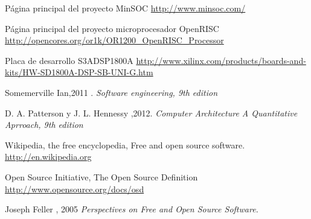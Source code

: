 \documentclass[a4paper,12pt]{article}
\begin{document}
\begin{thebibliography}{99}	  
  Página principal del proyecto MinSOC
\url{http://www.minsoc.com/}

 Página principal del proyecto microprocesador OpenRISC
\url{http://opencores.org/or1k/OR1200_OpenRISC_Processor}

 Placa de desarrollo S3ADSP1800A
\url{http://www.xilinx.com/products/boards-and-kits/HW-SD1800A-DSP-SB-UNI-G.htm}

 Somemerville Ian,2011 .
\textit{Software engineering, 9th edition}

 D. A. Patterson y J. L. Hennessy ,2012.
 \textit{Computer Architecture A Quantitative Aprroach, 9th edition}

Wikipedia, the free encyclopedia, Free and open source software.
\url{http://en.wikipedia.org}

Open Source Initiative, The Open Source Definition
\url{http://www.opensource.org/docs/osd}

Joseph Feller , 2005 
\textit{Perspectives on Free and Open Source Software.}

\end{thebibliography}
\end{document}
